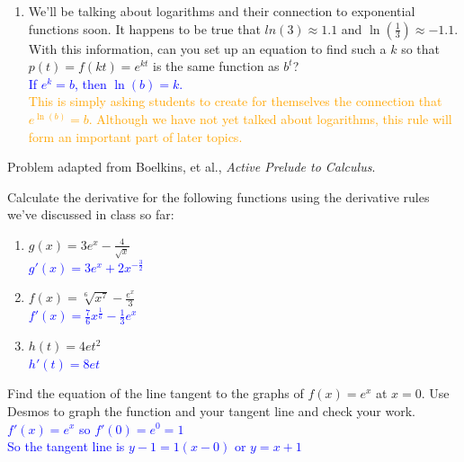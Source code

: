 \documentclass{ximera}
\begin{document}
\begin{exercise}
\begin{enumerate}
        \item  We'll be talking about logarithms and their connection to exponential functions soon. 
        It happens to be true that $ln(3)\approx 1.1$ and $\ln(\frac{1}{3})\approx -1.1$. With this information, can you set up an equation to find such a $k$ so that $p(t)=f(kt)=e^{kt}$ is the same function as $b^t$? \\
        \textcolor{blue}{ If $e^k=b$, then $\ln(b)=k$.}\\
        \textcolor{orange}{This is simply asking students to create for themselves the connection that $e^{\ln(b)}=b$.  Although we have not yet talked about logarithms, this rule will form an important part of later topics.   }
   
   
    \end{enumerate}  
   
    Problem adapted from Boelkins, et al., \textit{Active Prelude to Calculus}.
\end{exercise}

\begin{exercise}
    Calculate the derivative for the following functions using the derivative rules we've discussed in class so far: 
        \begin{enumerate}
                \item $g(x)=3e^x-\frac{4}{\sqrt{x}}$\\
                \textcolor{blue}{ $g'(x)=3e^x+2 x^{-\frac32}$}
    
                \item $f(x)=\sqrt[6]{x^7} -\frac{e^x}{3}$\\
                \textcolor{blue}{ $f'(x)=\frac{7}{6}x^{\frac16}-\frac13e^x$}
    
                \item $h(t)=4et^2$\\
                \textcolor{blue}{ $h'(t)=8et$}
    
        \end{enumerate}
\end{exercise}

\begin{exercise}
    Find the equation of the line tangent to the graphs of $f(x)=e^x$ at $x=0$.  Use Desmos to graph the function and your tangent line and check your work.\\
    \textcolor{blue}{ $f'(x)=e^x$ so $f'(0)=e^0=1$\\
    So the tangent line is $y-1=1(x-0)$ or $y=x+1$}
    \begin{center}
    \end{center}
    
\end{exercise}
\end{document}
